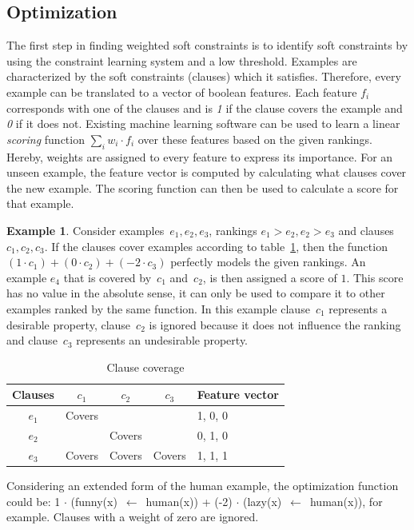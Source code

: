 \documentclass[letterpaper]{article}
\theoremstyle{definition}
\newtheorem{example}{Example}
\begin{document}
\subsection{Optimization}
The first step in finding weighted soft constraints is to identify soft constraints by using the constraint learning system and a low threshold.
Examples are characterized by the soft constraints (clauses) which it satisfies.
Therefore, every example can be translated to a vector of boolean features.
Each feature $f_i$ corresponds with one of the clauses and is \emph{1} if the clause covers the example and \emph{0} if it does not.
Existing machine learning software can be used to learn a linear \emph{scoring} function $\sum_i w_i \cdot f_i$ over these features based on the given rankings.
Hereby, weights are assigned to every feature to express its importance.
For an unseen example, the feature vector is computed by calculating what clauses cover the new example.
The scoring function can then be used to calculate a score for that example.

\begin{example}
  Consider examples~$e_1, e_2, e_3$, rankings $e_1 > e_2, e_2 > e_3$ and clauses $c_1, c_2, c_3$.
  If the clauses cover examples according to table~\ref{tbl:cover_examples}, then the function $(1 \cdot c_1) + (0\cdot c_2) + (-2\cdot c_3)$ perfectly models the given rankings.
  An example $e_4$ that is covered by~$c_1$ and~$c_2$, is then assigned a score of $1$.
  This score has no value in the absolute sense, it can only be used to compare it to other examples ranked by the same function.
  In this example clause~$c_1$ represents a desirable property, clause~$c_2$ is ignored because it does not influence the ranking and clause~$c_3$ represents an undesirable property.

  \begin{table}[!htp]
  \caption{Clause coverage}
  \label{tbl:cover_examples}
  \begin{tabularx}{\textwidth}{c|ccc|X}
    \textbf{Clauses}  &$c_1$    & $c_2$   & $c_3$   & \textbf{Feature vector}\\
    \toprule
    $e_1$         & Covers  &       &       & 1, 0, 0\\
    $e_2$         &       & Covers  &       & 0, 1, 0\\
    $e_3$         & Covers  & Covers  & Covers  & 1, 1, 1\\
  \end{tabularx}
  \end{table}

  Considering an extended form of the human example, the optimization function could be:
  1 $\cdot$ (funny(x)~$\leftarrow$~human(x)) + (-2) $\cdot$ (lazy(x)~$\leftarrow$~human(x)), for example.
  Clauses with a weight of zero are ignored.
\end{example}
\end{document}
